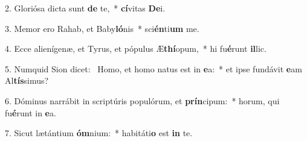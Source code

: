 2. Gloriósa dicta sunt \textbf{de} te,~*  \textbf{cí}vitas \textbf{De}i.\

3. Memor ero Rahab, et Baby\textbf{ló}nis~*  sci\textbf{én}ti\textbf{um} me.\

4. Ecce alienígenæ, et Tyrus, et pópulus Æ\textbf{thí}opum,~*  hi fu\textbf{é}runt \textbf{il}lic.\

5. Numquid Sion dicet: \dag\  Homo, et homo natus est in \textbf{e}a:~*  et ipse fundávit \textbf{e}am Al\textbf{tís}simus?\

6. Dóminus narrábit in scriptúris populórum, et \textbf{prín}cipum:~*  horum, qui fu\textbf{é}runt in \textbf{e}a.\

7. Sicut lætántium \textbf{óm}nium:~*  habitáti\textbf{o} est \textbf{in} te.\


